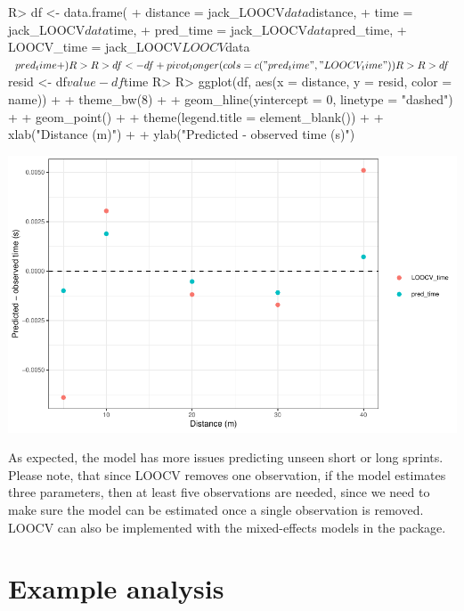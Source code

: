 \documentclass[
]{jss}
\begin{document}
\begin{CodeChunk}
\begin{CodeInput}
R> df <- data.frame(
+   distance = jack_LOOCV$data$distance,
+   time = jack_LOOCV$data$time,
+   pred_time = jack_LOOCV$data$pred_time,
+   LOOCV_time = jack_LOOCV$LOOCV$data$pred_time
+ )
R> 
R> df <- df %
+   pivot_longer(cols = c("pred_time", "LOOCV_time"))
R> 
R> df$resid <- df$value - df$time
R> 
R> ggplot(df, aes(x = distance, y = resid, color = name)) +
+   theme_bw(8) +
+   geom_hline(yintercept = 0, linetype = "dashed") +
+   geom_point() +
+   theme(legend.title = element_blank()) +
+   xlab("Distance (m)") +
+   ylab("Predicted - observed time (s)")
\end{CodeInput}


\begin{center}\includegraphics[width=1\linewidth]{paper_files/figure-latex/unnamed-chunk-50-1} \end{center}

\end{CodeChunk}

As expected, the model has more issues predicting unseen short or long sprints. Please note, that since LOOCV removes one observation, if the model estimates three parameters, then at least five observations are needed, since we need to make sure the model can be estimated once a single observation is removed. LOOCV can also be implemented with the mixed-effects models in the  package.

\hypertarget{example-analysis}{%
\section{Example analysis}\label{example-analysis}}
\end{document}
